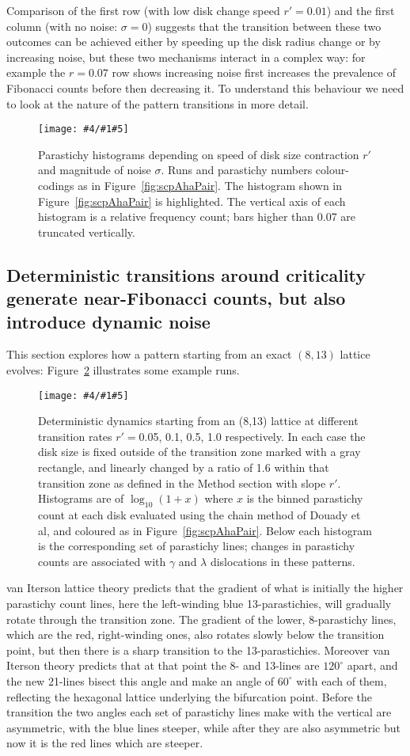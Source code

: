 \documentclass[a4paper,10pt]{amsart}
\newlength{\jfigwidth}
\newcommand{\pdffig}[3]{\jdofig{#1}{#2}{#3}{Figures}{.pdf}}
\newcommand{\jdofig}[5]{
	\begin{figure}\centering\texttt{[image: \#4/\#1\#5]} \caption{#2}\label{fig:#1}\end{figure}
}
\begin{document}
Comparison of the first row (with low disk change speed $r'=0.01$) and the first column (with no noise: $\sigma=0$) suggests that the transition between these two outcomes can be achieved either by speeding up the disk radius change or by increasing noise, but these two mechanisms interact in a complex way: for example the $r=0.07$ row shows increasing noise first increases the prevalence of Fibonacci counts before then decreasing it. To understand this behaviour we need to look at the nature of the pattern transitions in more detail.

\pdffig{scpTo55}{Parastichy histograms depending on speed of disk size contraction $r'$ and magnitude of noise $\sigma$.  Runs and parastichy numbers colour-codings as in Figure~\ref{fig:scpAhaPair}. The histogram shown in Figure~\ref{fig:scpAhaPair} is highlighted. The vertical axis of each histogram is a relative frequency count; bars higher than 0.07 are truncated vertically.}{1}


\subsection{Deterministic transitions around criticality generate near-Fibonacci counts, but also introduce dynamic noise}

This section explores how a pattern starting from an exact $(8,13)$ lattice evolves: Figure~\ref{fig:scpDet813} illustrates some example runs.
 \pdffig{scpDet813}{Deterministic dynamics starting from an (8,13) lattice at different transition rates $r'=$0.05, 0.1, 0.5, 1.0 respectively. In each case the disk size is fixed outside of the transition zone marked with a gray rectangle, and linearly changed by a ratio of 1.6 within that transition zone as defined in the Method section with slope $r'$.  Histograms are of $\log_{10} (1+x) $ where $x$ is the binned parastichy count at each disk evaluated using the chain method of Douady et al, and coloured as in Figure~\ref{fig:scpAhaPair}. Below each histogram is the corresponding set of parastichy lines; changes in parastichy counts are associated with $\gamma$ and $\lambda$ dislocations in these patterns.}{.9}
%
 van Iterson lattice theory predicts that the gradient of what is initially the higher parastichy count lines, here the left-winding blue 13-parastichies, will gradually rotate through the transition zone. The gradient of the lower, 8-parastichy lines, which are the red, right-winding ones, also rotates slowly below the transition point, but then there is a sharp transition to the 13-parastichies. Moreover  van Iterson theory predicts that at that point the 8- and 13-lines are $120^{\circ}$ apart, and the new 21-lines bisect this angle and make an angle of $60^\circ$ with each of them, reflecting the hexagonal lattice underlying the bifurcation point. Before the transition the two angles each set of parastichy lines make with the vertical are asymmetric, with the blue lines steeper, while after they are also asymmetric but now it is the red lines which are steeper.
 
\end{document}
